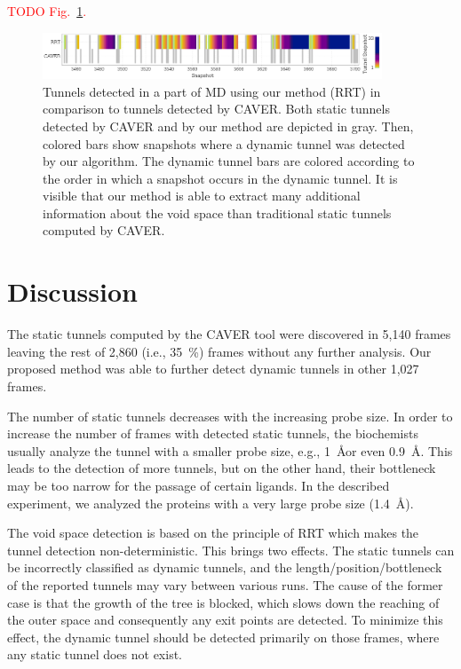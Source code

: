 \documentclass[usletter, 10pt, conference]{svjour3}      %
\begin{document}
{\textcolor{red}{TODO Fig.~\ref{fig::caver34}.}}

\begin{figure}
\centering
\includegraphics[width=0.9\textwidth]{fig/caver3450-3700_colored}
\caption{\label{fig::caver34}
Tunnels detected in a part of MD using our method (RRT) in comparison to tunnels detected by CAVER.
Both static tunnels detected by CAVER and by our method are depicted in gray.
Then, colored bars show snapshots where a dynamic tunnel was detected by our algorithm.
The dynamic tunnel bars are colored according to the order in which a snapshot occurs in the dynamic tunnel.
It is visible that our method is able to extract many additional information about the void space than traditional static tunnels computed by CAVER.
}
\end{figure}




\section{Discussion}

The static tunnels computed by the CAVER tool were discovered in 5,140 frames leaving the rest of 2,860 (i.e., 35~\%) 
frames without any further analysis.
Our proposed method was able to further detect dynamic tunnels in other 1,027 frames.


The number of static tunnels decreases with the increasing probe size. 
In order to increase the number of frames with detected static tunnels, the biochemists usually analyze the tunnel with a smaller probe size, e.g., 1~\AA or even 0.9~\AA.
This leads to the detection of more tunnels, but on the other hand, their bottleneck may be too narrow for the passage of certain ligands.
In the described experiment, we analyzed the proteins with a very large probe size (1.4~\AA).

The void space detection is based on the principle of RRT which makes the tunnel detection non-deterministic.
This brings two effects. The static tunnels can be incorrectly classified as dynamic tunnels, and the length/position/bottleneck of the reported tunnels may vary between various runs.
The cause of the former case is that the growth of the tree is blocked, which slows down the reaching of the outer space and consequently any exit points are detected.
To minimize this effect, the dynamic tunnel should be detected primarily on those frames, where any static tunnel does not exist.
\end{document}

